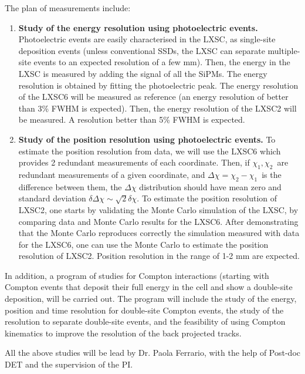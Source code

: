 The plan of measurements include:
\begin{enumerate}
\item {\bf Study of the energy resolution using photoelectric events.} Photoelectric events are easily characterised in the LXSC, as single-site deposition events (unless conventional SSDs, the LXSC can separate multiple-site events to an expected resolution of a few mm). Then, the energy in the LXSC is measured by adding the signal of all the SiPMs. The energy resolution is obtained by fitting the photoelectric peak. The energy resolution of the LXSC6 will be measured as reference (an energy resolution of better than 3\% FWHM is expected). Then, the energy resolution of the LXSC2 will be measured. A resolution better than 5\% FWHM is expected.
\item {\bf Study of the position resolution using photoelectric events.} To estimate the position resolution from data, we will use the LXSC6 which provides 2 redundant measurements of each coordinate. Then, if $\chi_1,\chi_2$~are redundant measurements of a given coordinate, and $\Delta \chi = \chi_2 - \chi_1$~is the difference between them, the $\Delta \chi$ distribution should have mean zero and standard deviation  
$\delta \Delta \chi \sim \sqrt{2} \delta \chi$. To estimate the position resolution of LXSC2, one starts by validating the Monte Carlo simulation of the LXSC, by comparing data and Monte Carlo results for the LXSC6. After demonstrating that the Monte Carlo reproduces correctly the simulation measured with data for the LXSC6, one can use the Monte Carlo to estimate the position resolution of LXSC2. Position resolution in the range of 1-2 mm are expected. 
\end{enumerate}

In addition, a program of studies for Compton interactions (starting with Compton events that deposit their full energy in the cell and show a double-site deposition, will be carried out. The program will include the study of the energy, position and time resolution for double-site Compton events, the study of the resolution to separate double-site events, and the feasibility of using Compton kinematics to improve the resolution of the back projected tracks. 

All the above studies will be lead by Dr. Paola Ferrario, with the help of Post-doc DET and the supervision of the PI. 

